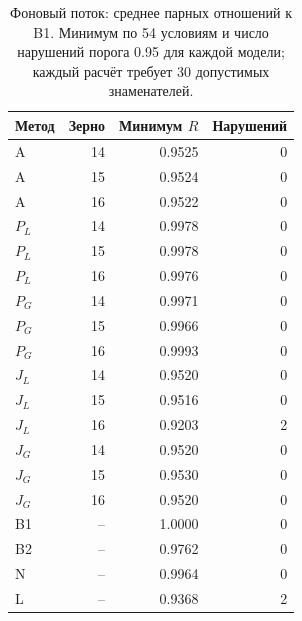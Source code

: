 \begin{table}[htbp]
\centering
\caption{Фоновый поток: среднее парных отношений к B1. Минимум по 54 условиям и число нарушений порога 0.95 для каждой модели; каждый расчёт требует 30 допустимых знаменателей.}
\label{tab:main-background}
\small
\begin{tabular}{lrrr}
\hline
Метод & Зерно & Минимум $R$ & Нарушений \\
\hline
A & 14 & 0.9525 & 0 \\
A & 15 & 0.9524 & 0 \\
A & 16 & 0.9522 & 0 \\
$P_{L}$ & 14 & 0.9978 & 0 \\
$P_{L}$ & 15 & 0.9978 & 0 \\
$P_{L}$ & 16 & 0.9976 & 0 \\
$P_{G}$ & 14 & 0.9971 & 0 \\
$P_{G}$ & 15 & 0.9966 & 0 \\
$P_{G}$ & 16 & 0.9993 & 0 \\
$J_{L}$ & 14 & 0.9520 & 0 \\
$J_{L}$ & 15 & 0.9516 & 0 \\
$J_{L}$ & 16 & 0.9203 & 2 \\
$J_{G}$ & 14 & 0.9520 & 0 \\
$J_{G}$ & 15 & 0.9530 & 0 \\
$J_{G}$ & 16 & 0.9520 & 0 \\
B1 & -- & 1.0000 & 0 \\
B2 & -- & 0.9762 & 0 \\
N & -- & 0.9964 & 0 \\
L & -- & 0.9368 & 2 \\
\hline
\end{tabular}
\end{table}
